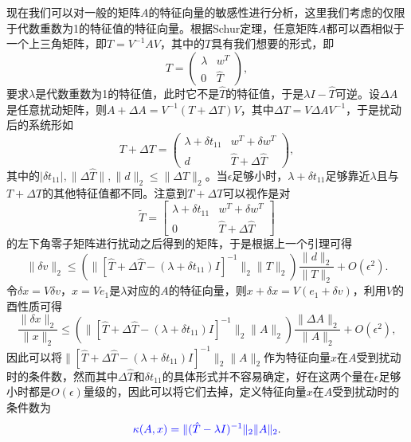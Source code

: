 \documentclass[a4paper,10pt]{ctexart}
\begin{document}
现在我们可以对一般的矩阵$ A $的特征向量的敏感性进行分析，这里我们考虑的仅限于代数重数为1的特征值的特征向量。根据Schur定理，任意矩阵$ A $都可以酉相似于一个上三角矩阵，即$ T = V^{-1}AV $，其中的$ T $具有我们想要的形式，即
\[
    T = 
    \begin{pmatrix} 
        \lambda & w^T \\
        0 & \hat{T} 
    \end{pmatrix} ,
\]
要求$ \lambda $是代数重数为1的特征值，此时它不是$ \hat{T} $的特征值，于是$ \lambda I - \hat{T} $可逆。设$ \Delta A $是任意扰动矩阵，则$ A+\Delta A = V^{-1}(T+\Delta T)V $，其中$ \Delta T = V\Delta AV^{-1} $，于是扰动后的系统形如
\[
    T+\Delta T = 
    \begin{pmatrix} 
        \lambda +\delta t_{11} & w^T + \delta w^T \\
        d & \hat{T} + \Delta \hat{T} 
    \end{pmatrix} ,
\]
其中的$ |\delta t_{11}|, \| \Delta \hat{T} \|, \| d \|_2 \leqslant \| \Delta T \|_2 $。当$ \epsilon $足够小时，$ \lambda+\delta t_{11} $足够靠近$ \lambda $且与$ T+\Delta T $的其他特征值都不同。注意到$ T+\Delta T $可以视作是对
\[
    \tilde{T} =
    \begin{bmatrix} 
        \lambda + \delta t_{11} & w^T+\delta w^T \\
        0 & \hat{T} +\Delta \hat{T}
    \end{bmatrix} 
\]
的左下角零子矩阵进行扰动之后得到的矩阵，于是根据上一个引理可得
\[
    \| \delta v \|_2 \leqslant  (\| [\hat{T}+\Delta \hat{T}-(\lambda+\delta t_{11})I]^{-1} \|_2 \| T \|_2 ) \frac{\| d \|_2}{\| T \|_2} + O(\epsilon^2).
\]
令$ \delta x = V \delta v $，$ x = V e_1 $是$ \lambda $对应的$ A $的特征向量，则$ x+\delta x = V(e_1+\delta v) $，利用$ V $的酉性质可得
\[
    \frac{\| \delta x \|_2}{\| x \|_2} \leqslant (\| [\hat{T}+\Delta \hat{T}-(\lambda+\delta t_{11})I]^{-1} \|_2 \| A \|_2 ) \frac{\| \Delta A \|_2}{\| A \|_2} + O(\epsilon^2),
\]
因此可以将$ \| [\hat{T}+\Delta \hat{T}-(\lambda+\delta t_{11})I]^{-1} \|_2 \| A \|_2 $作为特征向量$ x $在$ A $受到扰动时的条件数，然而其中$ \Delta \hat{T} $和$ \delta t_{11} $的具体形式并不容易确定，好在这两个量在$ \epsilon $足够小时都是$ O(\epsilon) $量级的，因此可以将它们去掉，定义特征向量$ x $在$ A $受到扰动时的条件数为
\begin{equation}
    \textcolor{blue}{\kappa(A,x) = \| (\hat{T}-\lambda I)^{-1} \|_2 \| A \|_2}.
\end{equation}
\end{document}
